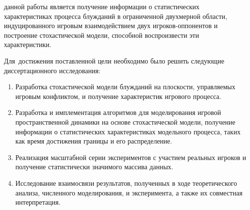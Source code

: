 
{\aim} данной работы является получение информации о статистических
характеристиках процесса блужданий в ограниченной двухмерной области, индуцированного игровым
взаимодействием двух игроков-оппонентов и построение стохастической модели, способной воспроизвести эти характеристики. 

Для~достижения поставленной цели необходимо было решить следующие {\tasks} диссертационного исследования:
\begin{enumerate}[beginpenalty=10000] %
    \item Разработка стохастической модели блужданий на плоскости, управляемых
    игровым конфликтом, и получение характеристик игрового процесса.
    \item Разработка и имплементация алгоритмов для моделирования
    игровой пространственной динамики на основе стохастической
    модели, получение информации о статистических характеристиках
    модельного процесса, таких как время достижения границы и его
    распределение.
    \item Реализация масштабной серии экспериментов с участием
    реальных игроков и получение статистически значимого массива
    данных.
    \item Исследование взаимосвязи результатов, полученных в ходе
    теоретического анализа, численного моделирования, и эксперимента, а
    также их совместная интерпретация.
\end{enumerate}


